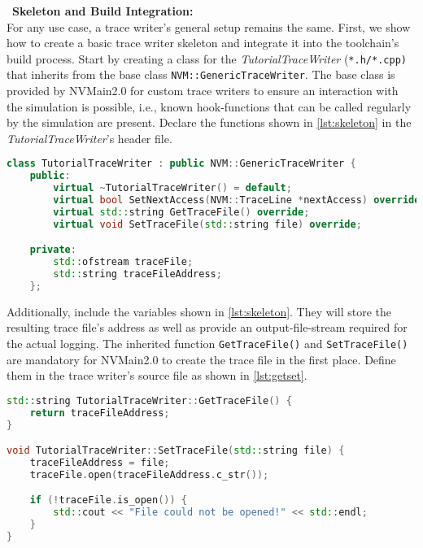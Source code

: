 ~\noindent \textbf{Skeleton and Build Integration:}\\
For any use case, a trace writer's general setup remains the same. First, we show how to create a basic trace writer skeleton and integrate it into the toolchain's build process. Start by creating a class for the \emph{TutorialTraceWriter} (\texttt{*.h/*.cpp)} that inherits from the base class \texttt{NVM::GenericTraceWriter}. The base class is provided by NVMain2.0 for custom trace writers to ensure an interaction with the simulation is possible, i.e., known hook-functions that can be called regularly by the simulation are present. Declare the functions shown in \cref{lst:skeleton} in the \emph{TutorialTraceWriter}'s header file.
\begin{lstlisting}[caption={Trace Writer Skeleton},label=lst:skeleton,language=c++,basicstyle=\ttfamily\scriptsize]
class TutorialTraceWriter : public NVM::GenericTraceWriter {
    public:
        virtual ~TutorialTraceWriter() = default;
        virtual bool SetNextAccess(NVM::TraceLine *nextAccess) override;
        virtual std::string GetTraceFile() override;
        virtual void SetTraceFile(std::string file) override;

    private:
        std::ofstream traceFile;
        std::string traceFileAddress;
    };
\end{lstlisting}
Additionally, include the variables shown in \cref{lst:skeleton}. They will store the resulting trace file's address as well as provide an output-file-stream required for the actual logging. The inherited function \texttt{GetTraceFile()} and \texttt{SetTraceFile()} are mandatory for NVMain2.0 to create the trace file in the first place. Define them in the trace writer's source file as shown in \cref{lst:getset}.
\begin{lstlisting}[caption={Getter/Setter Definition},label=lst:getset,language=c++,basicstyle=\ttfamily\scriptsize]
std::string TutorialTraceWriter::GetTraceFile() {
    return traceFileAddress;
}

void TutorialTraceWriter::SetTraceFile(std::string file) {
    traceFileAddress = file;
    traceFile.open(traceFileAddress.c_str());

    if (!traceFile.is_open()) {
        std::cout << "File could not be opened!" << std::endl;
    }
}
\end{lstlisting}

